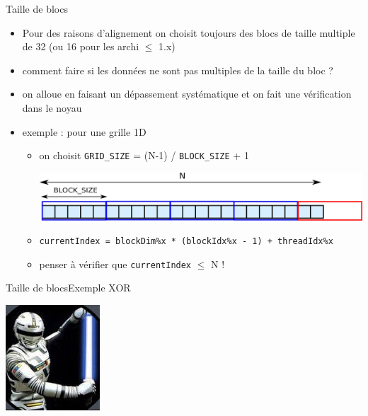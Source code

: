 \documentclass[11pt,mathserif]{beamer}
\newcommand{\scout}{\faAngellist}
\newcommand{\galde}{\faQuestion}
\newcommand{\argi}{\faLightbulbO}
\newcommand{\kontuz}{\faExclamationTriangle}
\newcommand{\egia}{\faCheckCircle}
\newif\ifC
\newcommand{\extcu}{cu}
\newcommand{\extcu}{cuf}
\newcommand{\includeSrcCu}[1]{}
\begin{document}
\begin{frame}{Taille de blocs}
  \begin{itemize}[<+->]
    \item[\scout] Pour des raisons d'alignement on choisit toujours des blocs de taille multiple de 32 (ou 16 pour les archi $\leqslant$ 1.x)
    \item[\galde] comment faire si les données ne sont pas multiples de la taille du bloc ?
    \item[\argi] on alloue en faisant un dépassement systématique et on fait une vérification dans le noyau
    \item exemple : pour une grille 1D
  \begin{itemize}
    \item[\egia] on choisit \texttt{GRID\_SIZE} = (N-1) / \texttt{BLOCK\_SIZE} + 1
\begin{center}
  \colorbox{white}{\includegraphics[width=0.7\linewidth]{fig/grille_1D.eps}}
\end{center}
\ifC
   \item[\egia] \texttt{\small currentIndex = blockDim.x * blockIdx.x + threadIdx.x}
\else
   \item[\egia] \texttt{\small currentIndex = blockDim\%x * (blockIdx\%x - 1) + threadIdx\%x}
\fi
   \item[\kontuz] penser à vérifier que \texttt{currentIndex} \ifC $<$ \else $\leq$ \fi N !
 \end{itemize}
  \end{itemize}
\end{frame}

\begin{frame}{Taille de blocs}{Exemple XOR}
\begin{flushright}
\includegraphics[width=0.1\linewidth]{fig/xor.jpg}
\end{flushright}
  \includeSrcCu{code/overflow}
\end{frame}
\end{document}

